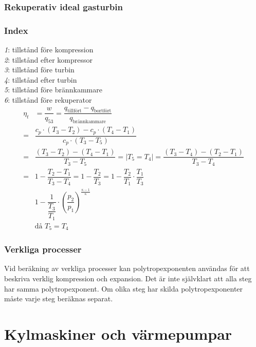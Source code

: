\subsubsection*{Rekuperativ ideal gasturbin}
\subsubsection*{Index}
	\textit{1}: tillstånd före kompression\\ 
	\textit{2}: tillstånd efter kompressor\\ 
	\textit{3}: tillstånd före turbin\\ 
	\textit{4}: tillstånd efter turbin\\ 
	\textit{5}: tillstånd före brännkammare\\ 
	\textit{6}: tillstånd före rekuperator
	\begin{align*}
		\eta_t & = \dfrac{w}{q_{53}} = \dfrac{q_{\text{tillfört}} - q_{\text{bortfört}}}{q_{\text{brännkammare}}} \\
		= &  \dfrac{c_p \cdot (T_3 - T_2) - c_p \cdot (T_4 - T_1)}{c_p \cdot (T_3 - T_5)} \\
		= &  \dfrac{(T_3 - T_2) - (T_4 - T_1)}{T_3 - T_5} = \bigg| T_5 = T_4 \bigg| = \dfrac{(T_3 - T_4) - (T_2 - T_1)}{T_3 - T_4} \\
		= & 1- \dfrac{T_2 - T_1}{T_3 - T_4} = 1 - \dfrac{T_2}{T_3} = 1 - \dfrac{T_2}{T_1} \cdot \dfrac{T_1}{T_3}\\ 
			& 1 - \dfrac{1}{\dfrac{T_3}{T_1}} \cdot \left(\dfrac{p_2}{p_1}\right)^\frac{\kappa -1}{\kappa} \\
			& \text{då } T_5 = T_4
	\end{align*}
\subsubsection*{Verkliga processer}
Vid beräkning av verkliga processer kan polytropexponenten användas för att beskriva verklig kompression och expansion. Det är inte självklart att alla steg har samma polytropexponent. Om olika steg har skilda polytropexponenter måste varje steg beräknas separat. 
\section*{Kylmaskiner och värmepumpar}
